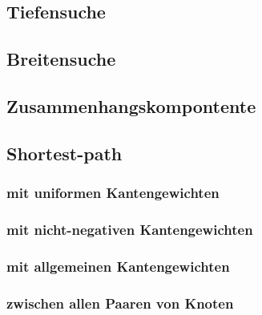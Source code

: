 \documentclass[a4paper]{article}
\begin{document}
\subsection{Tiefensuche}

\subsection{Breitensuche}

\subsection{Zusammenhangskompontente}

\subsection{Shortest-path}

\subsubsection{mit uniformen Kantengewichten}

\subsubsection{mit nicht-negativen Kantengewichten}

\subsubsection{mit allgemeinen Kantengewichten}

\subsubsection{zwischen allen Paaren von Knoten}
\end{document}
